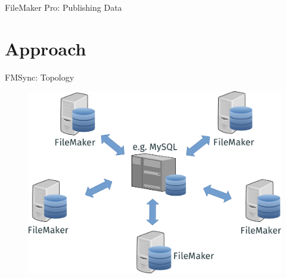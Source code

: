 \documentclass[xcolor=x11names, aspectratio=169,usenames,dvipsnames]{beamer}
\begin{document}
\begin{frame}{FileMaker Pro: Publishing Data}
\begin{figure}
\end{figure}
\end{frame}

\section{Approach}

\begin{frame}{FMSync: Topology}
\begin{figure}
	\includegraphics[height=.8\textheight]{img/topo.pdf}
\end{figure}
\end{frame}
\end{document}
